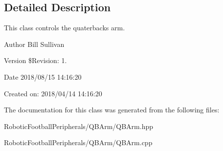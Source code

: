 \subsection{Detailed Description}
This class controls the quaterback\textquotesingle{}s arm. 

\begin{DoxyAuthor}{Author}
Bill Sullivan
\end{DoxyAuthor}
\begin{DoxyVersion}{Version}
\$\+Revision\+: 1.
\end{DoxyVersion}
\begin{DoxyDate}{Date}
2018/08/15 14\+:16\+:20
\end{DoxyDate}
Created on\+: 2018/04/14 14\+:16\+:20 

The documentation for this class was generated from the following files\+:\begin{DoxyCompactItemize}
\item 
Robotic\+Football\+Peripherals/\+Q\+B\+Arm/Q\+B\+Arm.\+hpp\item 
Robotic\+Football\+Peripherals/\+Q\+B\+Arm/Q\+B\+Arm.\+cpp\end{DoxyCompactItemize}
